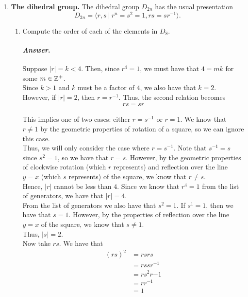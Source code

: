 \documentclass[11pt, reqno]{amsart}
\theoremstyle{plain}
\theoremstyle{definition}
\theoremstyle{example}
\newenvironment{ans}{\color{black}\medskip \paragraph*{\emph{Answer}.}}{\hfill \break  $~\!\!$ \dotfill \medskip }
\def\<{\langle} \def\>{\rangle}
\begin{document}
\begin{enumerate}[1.]
\item {\bf The dihedral group. } The dihedral group $D_{2n}$ has the usual presentation 
$$D_{2n} = \< r,s ~|~ r^n = s^2 = 1, rs=sr^{-1}\>.$$ 

\begin{enumerate}
\item Compute the order of each of the elements in $D_8$.

\begin{ans}
Suppose $|r| = k < 4$. Then, since $r^4 = 1$, we must have that $4 = mk$ for some $m \in \mathbb{Z}^+$.\\

Since $k > 1$ and $k$ must be a factor of $4$, we also have that $k = 2$.\\

However, if $|r| = 2$, then $r = r^{-1}$. Thus, the second relation becomes
\begin{align*}
rs = sr
\end{align*}

This implies one of two cases: either $r = s^{-1}$ or $r = 1$. We know that $r \neq 1$ by the geometric properties of rotation of a square, so we can ignore this case.\\

Thus, we will only consider the case where $r = s^{-1}$. Note that $s^{-1} = s$ since $s^2 = 1$, so we have that $r = s$. However, by the geometric properties of clockwise rotation (which $r$ represents) and reflection over the line $y = x$ (which $s$ represents) of the square, we know that $r \neq s$.\\

Hence, $|r|$ cannot be less than $4$. Since we know that $r^4 = 1$ from the list of generators, we have that $|r| = 4$.\\

From the list of generators we also have that $s^2 = 1$. If $s^1 = 1$, then we have that $s = 1$. However, by the properties of reflection over the line $y = x$ of the square, we know that $s \neq 1$.\\

Thus, $|s| = 2$.\\

Now take $rs$. We have that
\begin{align*}
(rs)^2 &= rsrs\\
&= rssr^{-1}\\
&= rs^2r{-1}\\
&= rr^{-1}\\
&= 1
\end{align*}


\end{ans}
\end{enumerate}
\end{enumerate}
\end{document}
